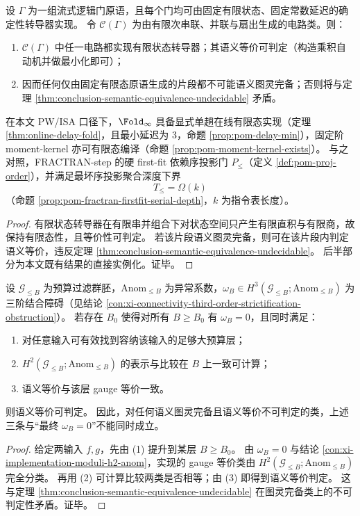 \begin{theorem}[有限态门系片段的可判定性与序门的结构地位]\label{thm:conclusion-finite-state-gate-fragment-decidable-order-gate-role}
设 \(\Gamma\) 为一组流式逻辑门原语，且每个门均可由固定有限状态、固定常数延迟的确定性转导器实现。
令 \(\mathcal C(\Gamma)\) 为由有限次串联、并联与扇出生成的电路类。则：
\begin{enumerate}
  \item \(\mathcal C(\Gamma)\) 中任一电路都实现有限状态转导器；其语义等价可判定（构造乘积自动机并做最小化即可）；
  \item 因而任何仅由固定有限态原语生成的片段都不可能语义图灵完备；否则将与定理 \ref{thm:conclusion-semantic-equivalence-undecidable} 矛盾。
\end{enumerate}
在本文 PW/ISA 口径下，\(\Fold_\infty\) 具备显式单趟在线有限态实现（定理 \ref{thm:online-delay-fold}，且最小延迟为 3，命题 \ref{prop:pom-delay-min}），固定阶 moment-kernel 亦可有限态编译（命题 \ref{prop:pom-moment-kernel-exists}）。
与之对照，FRACTRAN-step 的硬 first-fit 依赖序投影门 \(P_{\le}\)（定义 \ref{def:pom-proj-order}），并满足最坏序投影聚合深度下界
\[
T_{\le}=\Omega(k)
\]
（命题 \ref{prop:pom-fractran-firstfit-serial-depth}，\(k\) 为指令表长度）。
\end{theorem}
\begin{proof}
有限状态转导器在有限串并组合下对状态空间只产生有限直积与有限商，故保持有限态性，且等价性可判定。
若该片段语义图灵完备，则可在该片段内判定语义等价，违反定理 \ref{thm:conclusion-semantic-equivalence-undecidable}。
后半部分为本文既有结果的直接实例化。证毕。
\end{proof}

\begin{theorem}\label{thm:conclusion-turing-completeness-obstructs-eventual-omega-vanishing}
设 \(\mathcal G_{\le B}\) 为预算过滤群胚，\(\mathrm{Anom}_{\le B}\) 为异常系数，\(\omega_B\in H^3(\mathcal G_{\le B};\mathrm{Anom}_{\le B})\) 为三阶结合障碍（见结论 \ref{con:xi-connectivity-third-order-strictification-obstruction}）。
若存在 \(B_0\) 使得对所有 \(B\ge B_0\) 有 \(\omega_B=0\)，且同时满足：
\begin{enumerate}
  \item 对任意输入可有效找到容纳该输入的足够大预算层；
  \item \(H^2(\mathcal G_{\le B};\mathrm{Anom}_{\le B})\) 的表示与比较在 \(B\) 上一致可计算；
  \item 语义等价与该层 gauge 等价一致。
\end{enumerate}
则语义等价可判定。
因此，对任何语义图灵完备且语义等价不可判定的类，上述三条与“最终 \(\omega_B=0\)”不能同时成立。
\end{theorem}
\begin{proof}
给定两输入 \(f,g\)，先由 (1) 提升到某层 \(B\ge B_0\)。
由 \(\omega_B=0\) 与结论 \ref{con:xi-implementation-moduli-h2-anom}，实现的 gauge 等价类由
\(
H^2(\mathcal G_{\le B};\mathrm{Anom}_{\le B})
\)
完全分类。
再用 (2) 可计算比较两类是否相等；由 (3) 即得到语义等价判定。
这与定理 \ref{thm:conclusion-semantic-equivalence-undecidable} 在图灵完备类上的不可判定性矛盾。证毕。
\end{proof}

